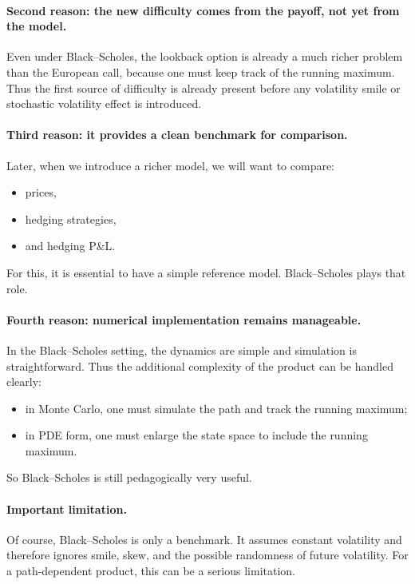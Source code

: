 \documentclass[11pt]{article}
\theoremstyle{plain}
\theoremstyle{definition}
\theoremstyle{remark}
\begin{document}
\paragraph{Second reason: the new difficulty comes from the payoff, not yet from the model.}
Even under Black--Scholes, the lookback option is already a much richer
problem than the European call, because one must keep track of the
running maximum.
Thus the first source of difficulty is already present before any
volatility smile or stochastic volatility effect is introduced.

\paragraph{Third reason: it provides a clean benchmark for comparison.}
Later, when we introduce a richer model, we will want to compare:
\begin{itemize}[leftmargin=1.4em]
    \item prices,
    \item hedging strategies,
    \item and hedging P\&L.
\end{itemize}

For this, it is essential to have a simple reference model.
Black--Scholes plays that role.

\paragraph{Fourth reason: numerical implementation remains manageable.}
In the Black--Scholes setting, the dynamics are simple and simulation is
straightforward.
Thus the additional complexity of the product can be handled clearly:
\begin{itemize}[leftmargin=1.4em]
    \item in Monte Carlo, one must simulate the path and track the
    running maximum;
    \item in PDE form, one must enlarge the state space to include the
    running maximum.
\end{itemize}

So Black--Scholes is still pedagogically very useful.

\paragraph{Important limitation.}
Of course, Black--Scholes is only a benchmark.
It assumes constant volatility and therefore ignores smile, skew, and
the possible randomness of future volatility.
For a path-dependent product, this can be a serious limitation.
\end{document}
